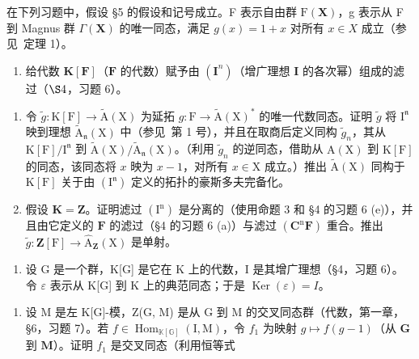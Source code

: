 
在下列习题中，假设 §5 的假设和记号成立。F 表示自由群 \(\mathrm{F}(\mathbf{X})\)，g 表示从 F 到 Magnus 群 \(\Gamma(\mathbf{X})\) 的唯一同态，满足 \(g(x)=1+x\) 对所有 \(x\in X\) 成立（参见~定理 1）。

\begin{enumerate}
\def\labelenumi{\arabic{enumi}.}
\tightlist
\item
  给代数 \(\mathbf{K}[\mathbf{F}]\)（\(\mathbf{F}\) 的代数）赋予由 \((\mathbf{I}^n)\)（增广理想 \(\mathbf{I}\) 的各次幂）组成的滤过（\(\S 4\)，习题 6）。
\end{enumerate}

\begin{enumerate}
\def\labelenumi{(\alph{enumi})}
\item
  令 \(\tilde{g}\colon \mathrm{K}[\mathrm{F}] \to \tilde{\mathrm{A}}(\mathrm{X})\) 为延拓 \(g\colon \mathrm{F} \to \tilde{\mathrm{A}}(\mathrm{X})^*\) 的唯一代数同态。证明 \(\tilde{g}\) 将 \(\mathrm{I}^{\mathfrak{n}}\) 映到理想 \(\tilde{\mathrm{A}}_{\mathfrak{n}}(\mathrm{X})\) 中（参见~第 1 号），并且在取商后定义同构 \(\tilde{g}_{n}\)，其从 \(\mathrm{K}[\mathrm{F}]/\mathrm{I}^{\mathfrak{n}}\) 到 \(\tilde{\mathrm{A}}(\mathrm{X})/\tilde{\mathrm{A}}_{\mathfrak{n}}(\mathrm{X})\)。（利用 \(\tilde{g}_{n}\) 的逆同态，借助从 \(\mathrm{A}(\mathrm{X})\) 到 \(\mathrm{K}[\mathrm{F}]\) 的同态，该同态将 \(x\) 映为 \(x - 1\)，对所有 \(x \in \mathrm{X}\) 成立。）推出 \(\tilde{\mathrm{A}}(\mathrm{X})\) 同构于 \(\mathrm{K}[\mathrm{F}]\) 关于由 \((\mathrm{I}^{\mathfrak{n}})\) 定义的拓扑的豪斯多夫完备化。
\item
  假设 \(\mathbf{K} = \mathbf{Z}\)。证明滤过 \((\mathrm{I}^{\mathrm{n}})\) 是分离的（使用命题 3 和 §4 的习题 6 (e)），并且由它定义的 \(\mathbf{F}\) 的滤过（§4 的习题 6 (a)）与滤过 \((\mathbf{C}^{\mathrm{n}}\mathbf{F})\) 重合。推出 \(\tilde{g}\colon \mathbf{Z}[\mathrm{F}] \to \hat{\mathrm{A}}_{\mathbf{Z}}(\mathrm{X})\) 是单射。
\end{enumerate}

\begin{enumerate}
\def\labelenumi{\arabic{enumi}.}
\setcounter{enumi}{1}
\tightlist
\item
  设 G 是一个群，K{[}G{]} 是它在 K 上的代数，I 是其增广理想（§4，习题 6）。令 \(\varepsilon\) 表示从 K{[}G{]} 到 K 上的典范同态；于是 \(\operatorname{Ker}(\varepsilon) = I\)。
\end{enumerate}

\begin{enumerate}
\def\labelenumi{(\alph{enumi})}
\tightlist
\item
  设 M 是左 K{[}G{]}-模，Z(G, M) 是从 G 到 M 的交叉同态群（代数，第一章，§6，习题 7）。若 \(f \in \operatorname{Hom}_{\mathbb{K}[\mathbb{G}]}(\mathrm{I}, \mathrm{M})\)，令 \(f_1\) 为映射 \(g \mapsto f(g - 1)\)（从 \(\mathbf{G}\) 到 \(\mathbf{M}\)）。证明 \(f_1\) 是交叉同态（利用恒等式
\end{enumerate}

